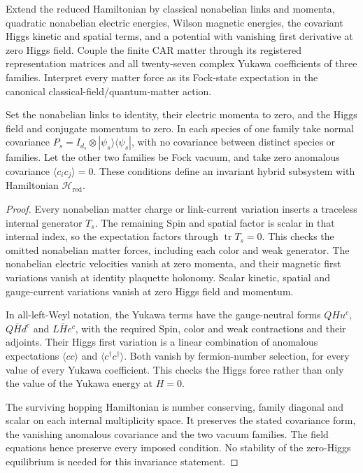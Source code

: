 \begin{proposition}
Extend the reduced Hamiltonian by classical nonabelian links and momenta,
quadratic nonabelian electric energies, Wilson magnetic energies,
the covariant Higgs kinetic and spatial terms, and a potential with vanishing
first derivative at zero Higgs field. Couple the finite CAR matter through
its registered representation matrices and all twenty-seven complex Yukawa
coefficients of three families. Interpret every matter force as its Fock-state
expectation in the canonical classical-field/quantum-matter action.

Set the nonabelian links to identity, their electric momenta to zero,
and the Higgs field and conjugate momentum to zero. In each species of one
family take normal covariance
$P_s=I_{d_s}\otimes|\psi_s\rangle\langle\psi_s|$,
with no covariance between distinct species or families. Let the other two
families be Fock vacuum, and take zero anomalous covariance
$\langle c_i c_j\rangle=0$. These conditions define an invariant hybrid
subsystem with Hamiltonian $\mathcal H_{\mathrm{red}}$.
\end{proposition}

\begin{proof}
Every nonabelian matter charge or link-current variation inserts a
traceless internal generator $T_s$. The remaining Spin and spatial factor
is scalar in that internal index, so the expectation factors through
$\operatorname{tr}T_s=0$. This checks the omitted nonabelian matter forces,
including each color and weak generator. The nonabelian electric velocities
vanish at zero momenta, and their magnetic first variations vanish at
identity plaquette holonomy. Scalar kinetic, spatial and gauge-current
variations vanish at zero Higgs field and momentum.

In all-left-Weyl notation, the Yukawa terms have the gauge-neutral forms
$QHu^c$, $Q\overline H d^c$ and $L\overline H e^c$, with the required
Spin, color and weak contractions and their adjoints. Their Higgs first
variation is a linear combination of anomalous expectations
$\langle cc\rangle$ and $\langle c^\dagger c^\dagger\rangle$.
Both vanish by fermion-number selection, for every value of every Yukawa
coefficient. This checks the Higgs force rather than only the value of the
Yukawa energy at $H=0$.

The surviving hopping Hamiltonian is number conserving, family diagonal
and scalar on each internal multiplicity space. It preserves the stated
covariance form, the vanishing anomalous covariance and the two vacuum
families. The field equations hence preserve every imposed condition.
No stability of the zero-Higgs equilibrium is needed for this invariance
statement.
\end{proof}

